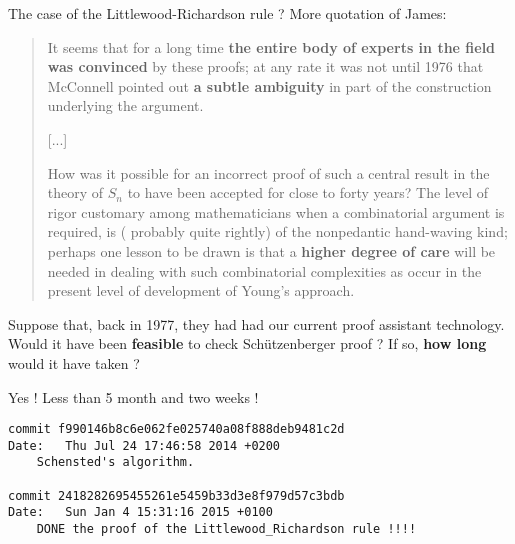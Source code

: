 \documentclass[compress,11pt]{beamer}
\newcommand{\red}[1]{{\color{red} #1}}
\newcommand{\green}[1]{{\color{red} #1}}
\begin{document}
\begin{frame}{The case of the Littlewood-Richardson rule ?}
More quotation of James:

\begin{quotation}\small
  It seems that for a long time \textbf{the entire body of experts in the
    field was convinced} by these proofs; at any rate it was not until 1976
  that McConnell pointed out \textbf{a subtle ambiguity} in part of the
  construction underlying the argument.

  [...]

  How was it possible for an \red{incorrect proof} of such a central result in
  the theory of $S_n$ to have been \red{accepted for close to forty years}?
  The level of rigor customary among mathematicians when a combinatorial
  argument is required, is (\green{probably quite rightly}) of the
  \green{nonpedantic hand-waving} kind; perhaps one lesson to be drawn is that
  a \textbf{higher degree of care} will be needed in dealing with such
  combinatorial complexities as occur in the present level of development of
  Young's approach.
\end{quotation}
\end{frame}

\begin{frame}[fragile]
  \begin{problem}
    Suppose that, back in 1977, they had had our current proof assistant
    technology. Would it have been \textbf{feasible} to check Schützenberger
    proof ? If so, \textbf{how long} would it have taken ?
  \end{problem}
  \bigskip\pause

  \begin{Theorem}
    Yes ! Less than 5 month and two weeks !
  \end{Theorem}

\small
\begin{verbatim}
commit f990146b8c6e062fe025740a08f888deb9481c2d
Date:   Thu Jul 24 17:46:58 2014 +0200
    Schensted's algorithm.

commit 2418282695455261e5459b33d3e8f979d57c3bdb
Date:   Sun Jan 4 15:31:16 2015 +0100
    DONE the proof of the Littlewood_Richardson rule !!!!
\end{verbatim}
\end{frame}
\end{document}
